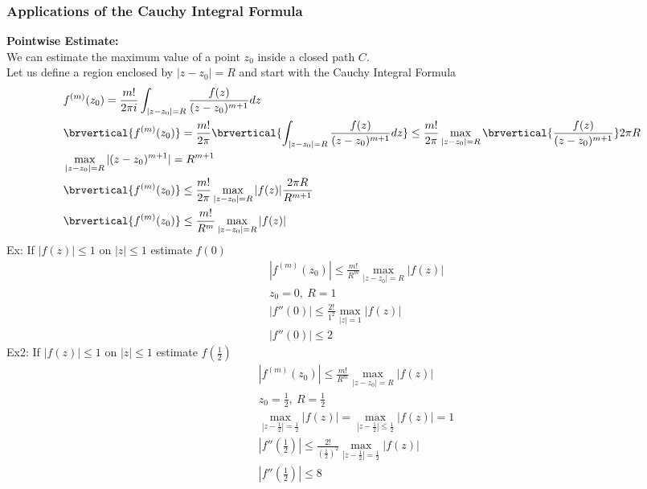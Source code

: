 \subsubsection{Applications of the Cauchy Integral Formula}
\textbf{Pointwise Estimate:}\\
We can estimate the maximum value of a point $z_0$ inside a closed path $C$.\\
Let us define a region enclosed by $|z-z_0|=R$ and start with the Cauchy Integral Formula
\begin{align*}
    &f^{(m)}(z_0)=\frac{m!}{2\pi i}\int_{|z-z_0|=R}\frac{f(z)}{(z-z_0)^{m+1}}dz\\
    &\brvertical{f^{(m)}(z_0)}=\frac{m!}{2\pi}\brvertical{\int_{|z-z_0|=R}\frac{f(z)}{(z-z_0)^{m+1}}dz}\leq\frac{m!}{2\pi}\max_{|z-z_0|=R}\brvertical{\frac{f(z)}{(z-z_0)^{m+1}}}2\pi R\\
    &\max_{|z-z_0|=R}|(z-z_0)^{m+1}|=R^{m+1}\\
    &\brvertical{f^{(m)}(z_0)}\leq\frac{m!}{2\pi}\max_{|z-z_0|=R}|f(z)|\frac{2\pi R}{R^{m+1}}\\
    &\brvertical{f^{(m)}(z_0)}\leq\frac{m!}{R^m}\max_{|z-z_0|=R}|f(z)|\\
\end{align*}
Ex: If $|f(z)|\leq 1$ on $|z|\leq 1$ estimate $f(0)$
\begin{align*}
    &|f^{(m)}(z_0)|\leq\frac{m!}{R^m}\max_{|z-z_0|=R}|f(z)|\\
    &z_0=0,\ R=1\\
    &|f''(0)|\leq \frac{2!}{1^2}\max_{|z|=1}|f(z)|\\
    &|f''(0)|\leq 2
\end{align*}
Ex2: If $|f(z)|\leq 1$ on $|z|\leq 1$ estimate $f(\tfrac{1}{2})$
\begin{align*}
    &|f^{(m)}(z_0)|\leq\frac{m!}{R^m}\max_{|z-z_0|=R}|f(z)|\\
    &z_0=\frac{1}{2},\ R=\frac{1}{2}\\
    &\max_{|z-\frac{1}{2}|=\frac{1}{2}}|f(z)|=\max_{|z-\frac{1}{2}|\leq\frac{1}{2}}|f(z)|=1\\
    &|f''(\tfrac{1}{2})|\leq\frac{2!}{(\tfrac{1}{2})^2}\max_{|z-\frac{1}{2}|=\frac{1}{2}}|f(z)|\\
    &|f''(\tfrac{1}{2})|\leq8
\end{align*}

